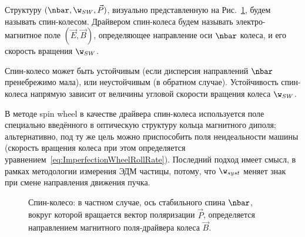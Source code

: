 Структуру $(\nbar, \w_{SW}, \vec P)$, визуально представленную на Рис.~\ref{fig:SpinWheel},
будем называть спин-колесом. Драйвером спин-колеса будем называть электро-магнитное поле $(\vec E, \vec B)$,
определяющее направление оси $\nbar$ колеса, и его скорость вращения $\w_{SW}$.

Спин-колесо может быть устойчивым (если дисперсия направлений $\nbar$ пренебрежимо мала), 
или неустойчивым (в обратном случае). Устойчивость спин-колеса напрямую зависит от 
величины угловой скорости вращения колеса $\w_{SW}$. 
 
В методе spin wheel в качестве драйвера спин-колеса используется поле 
специально введённого в оптическую структуру кольца магнитного диполя; альтернативно, 
под ту же цель можно приспособить поля неидеальности машины (скорость вращения колеса при этом
 определяется уравнением~\eqref{eq:ImperfectionWheelRollRate}). 
Последний подход имеет смысл, в рамках методологии измерения ЭДМ частицы, потому, 
что $\w_{syst}$ меняет знак при смене направления движения пучка.~\cite[стр.~11]{BNL:Deuteron2008}
 
 \begin{figure}[h]\centering
{}
 	\caption{Спин-колесо: в частном случае, ось стабильного спина $\nbar$, вокруг которой вращается вектор поляризации $\vec P$, определяется направлением магнитного поля-драйвера колеса $\vec B$.\label{fig:SpinWheel}}
 \end{figure}